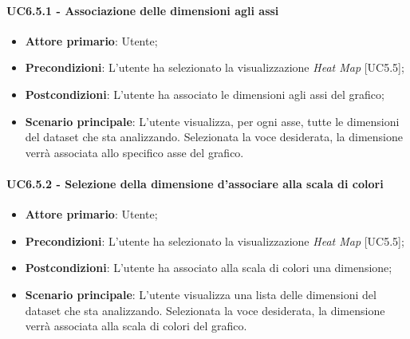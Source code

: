 \paragraph{UC6.5.1 - Associazione delle dimensioni agli assi}
\begin{itemize}
	\item \textbf{Attore primario}: Utente;
	\item \textbf{Precondizioni}: L'utente ha selezionato la visualizzazione \textit{Heat Map} [UC5.5];
	\item \textbf{Postcondizioni}: L'utente ha associato le dimensioni agli assi del grafico;
	
	\item \textbf{Scenario principale}: L'utente visualizza, per ogni asse, tutte le dimensioni del dataset che sta analizzando. Selezionata la voce desiderata, la dimensione verrà associata allo specifico asse del grafico. 
\end{itemize}

\paragraph{UC6.5.2 - Selezione della dimensione d'associare alla scala di colori}
\begin{itemize}
	\item \textbf{Attore primario}: Utente;
	\item \textbf{Precondizioni}: L'utente ha selezionato la visualizzazione \textit{Heat Map} [UC5.5];
	\item \textbf{Postcondizioni}: L'utente ha associato alla scala di colori una dimensione;
	
	\item \textbf{Scenario principale}: L'utente visualizza una lista delle dimensioni del dataset che sta analizzando. Selezionata la voce desiderata, la dimensione verrà associata alla scala di colori del grafico. 
\end{itemize}